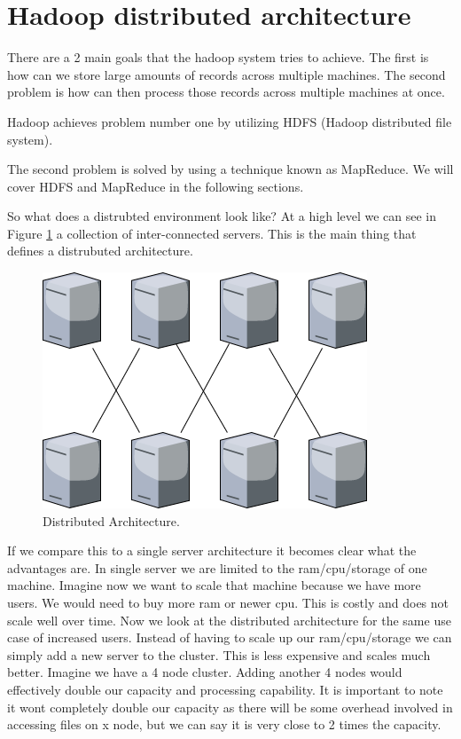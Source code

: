 \section{Hadoop distributed architecture}

There are a 2 main goals that the hadoop system tries to achieve. 
The first is how can we store large amounts of records across multiple machines.
The second problem is how can then process those records across multiple machines at once.

Hadoop achieves problem number one by utilizing HDFS (Hadoop distributed file system). 

The second problem is solved by using a technique known as MapReduce.
We will cover HDFS and MapReduce in the following sections. 

So what does a distrubted environment look like? At a high level we can see in Figure \ref{fig:distributed} a collection of inter-connected servers. This is the main thing that defines a distrubuted architecture. 

\begin{figure}[h!]
  \includegraphics[width=\linewidth]{./images/distributed.png}
  \caption{Distributed Architecture.}
  \label{fig:distributed}
\end{figure}

If we compare this to a single server architecture it becomes clear what the advantages are. In single server we are limited to the ram/cpu/storage of one machine. Imagine now we want to scale that machine because we have more users. We would need to buy more ram or newer cpu. This is costly and does not scale well over time. Now we look at the distributed architecture for the same use case of increased users. Instead of having to scale up our ram/cpu/storage we can simply add a new server to the cluster. This is less expensive and scales much better. Imagine we have a 4 node cluster. Adding another 4 nodes would effectively double our capacity and processing capability. It is important to note it wont completely double our capacity as there will be some overhead involved in accessing files on x node, but we can say it is very close to 2 times the capacity.
